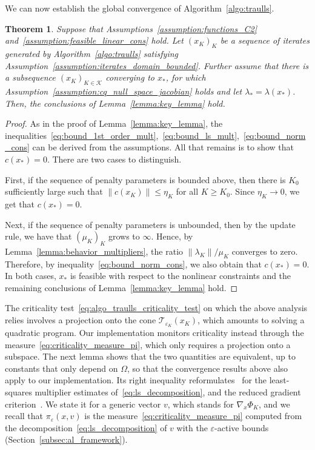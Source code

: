 \documentclass[pdflatex,sn-mathphys-num]{sn-jnl}%
\theoremstyle{thmstyleone}%
\newtheorem{theorem}{Theorem}%
\newcommand{\calK}{{\mathcal{K}}}
\newcommand{\calT}{{\mathcal{T}}}
\begin{document}
We can now establish the global convergence of Algorithm~\ref{algo:traulls}.
\begin{theorem}\label{theo:global_convergence_traulls}
	Suppose that Assumptions~\ref{assumption:functions_C2} and~\ref{assumption:feasible_linear_cons} hold. Let $\left(x_K\right)_{K}$ be a sequence of iterates generated by Algorithm~\ref{algo:traulls} satisfying Assumption~\ref{assumption:iterates_domain_bounded}. Further assume that there is a subsequence $(x_K)_{K \in \calK}$ converging to $x_*$, for which Assumption~\ref{assumption:cq_null_space_jacobian} holds and let $\lambda_* = \lambda(x_*)$.
	Then, the conclusions of Lemma~\ref{lemma:key_lemma} hold.
\end{theorem}
\begin{proof}
	As in the proof of Lemma~\ref{lemma:key_lemma}, the inequalities~\eqref{eq:bound_1st_order_mult},~\eqref{eq:bound_ls_mult},~\eqref{eq:bound_norm_cons} can be derived from the assumptions. All that remains is to show that $c(x_*) = 0$. There are two cases to distinguish. 
	
	First, if the sequence of penalty parameters is bounded above, then there is $K_0$ sufficiently large such that $\|c(x_K)\| \le \eta_K$ for all $K \ge K_0$. Since $\eta_K \to 0$, we get that $c(x_*) = 0$.
	
	Next, if the sequence of penalty parameters is unbounded, then by the update rule, we have that $(\mu_K)_K$ grows to $\infty$. Hence, by Lemma~\ref{lemma:behavior_multipliers}, the ratio $\|\lambda_K\|/\mu_K$ converges to zero. Therefore, by inequality~\eqref{eq:bound_norm_cons}, we also obtain that $c(x_*) = 0$. 
	In both cases, $x_*$ is feasible with respect to the nonlinear constraints and the remaining conclusions of Lemma~\ref{lemma:key_lemma} hold.
\end{proof}
The criticality test~\eqref{eq:algo_traulls_criticality_test} on which the above analysis relies involves a projection onto the cone $\calT_{\varepsilon_K}(x_K)$, which amounts to solving a quadratic program. Our implementation monitors criticality instead through the measure~\eqref{eq:criticality_measure_pi}, which only requires a projection onto a subspace. The next lemma shows that the two quantities are equivalent, up to constants that only depend on $\Omega$, so that the convergence results above also apply to our implementation. Its right inequality reformulates~\cite[Lemma~7.1]{conn-etal:1996b} for the least-squares multiplier estimates of~\eqref{eq:ls_decomposition}, and the reduced gradient criterion~\cite[(7.3)]{conn-etal:1996b}. We state it for a generic vector $v$, which stands for $\nabla_x\Phi_K$, and we recall that $\pi_\varepsilon(x,v)$ is the measure~\eqref{eq:criticality_measure_pi} computed from the decomposition~\eqref{eq:ls_decomposition} of $v$ with the $\varepsilon$-active bounds (Section~\ref{subsec:al_framework}).
\end{document}
